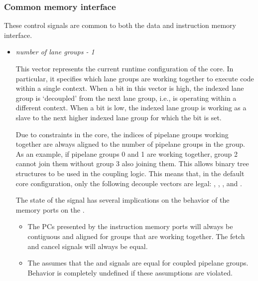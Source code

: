 
\subsubsection{Common memory interface}
\label{sec:core-ug-cfg-inst-port-cmem}

These control signals are common to both the data and instruction memory 
interface.

\begin{itemize}

\item {}\textit{number of lane groups - 1}

This vector represents the current runtime configuration of the core. In 
particular, it specifies which lane groups are working together to execute code 
within a single context. When a bit in this vector is high, the indexed lane 
group is `decoupled' from the next lane group, i.e., is operating within a 
different context. When a bit is low, the indexed lane group is working as a 
slave to the next higher indexed lane group for which the bit is set.

Due to constraints in the core, the indices of pipelane groups working together 
are always aligned to the number of pipelane groups in the group. As an example, 
if pipelane groups 0 and 1 are working together, group 2 cannot join them 
without group 3 also joining them. This allows binary tree structures to be used 
in the coupling logic. This means that, in the default core configuration, only 
the following decouple vectors are legal: , , 
,  and .

The state of the  signal has several implications on the 
behavior of the memory ports on the \rvex{}.

\begin{itemize}

\item The PCs presented by the instruction memory ports will always be 
contiguous and aligned for groups that are working together. The fetch and 
cancel signals will always be equal.

\item The \rvex{} assumes that the  and 
 signals are equal for coupled pipelane groups. 
Behavior is completely undefined if these assumptions are violated.

\end{itemize}


\end{itemize}
